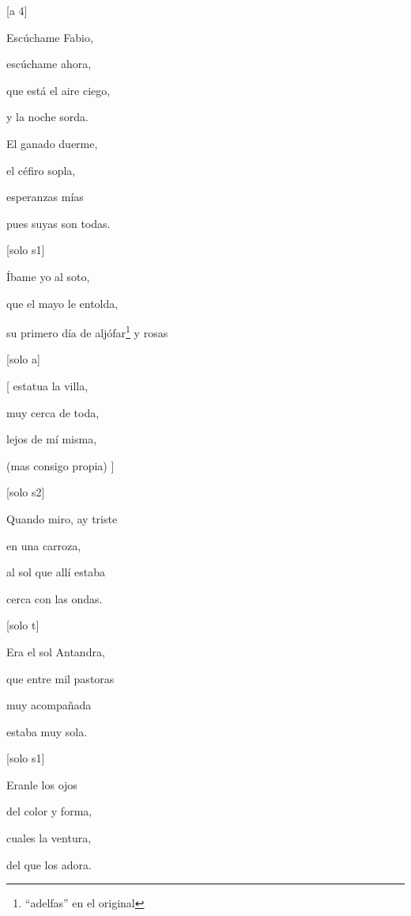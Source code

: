 \documentclass[titlepage,hidelinks]{article}
\begin{document}


\centering
\Large{

{[}a 4{]}

Esc{ú}chame Fabio,

esc{ú}chame ahora,

que está el aire ciego,

y la noche sorda.
\vspace{2\baselineskip}

El ganado duerme,

el céfiro sopla,

esperanzas mías

pues suyas son todas.
\vspace{2\baselineskip}

{[}solo s1{]}

Íbame yo al soto,

que el mayo le entolda,

su primero día de aljófar\footnote{\textsuperscript{}``adelfas'' en el original} y rosas
\vspace{2\baselineskip}

{[}solo a{]}

{[} estatua la villa,

  muy cerca de toda,

  lejos de mí misma,

  (mas consigo propia) {]}
\vspace{2\baselineskip}

{[}solo s2{]}

Quando miro, ay triste

en una carroza,

al sol que allí estaba

cerca con las ondas.
\vspace{2\baselineskip}

{[}solo t{]}

Era el sol Antandra,

que entre mil pastoras

muy acompañada

estaba muy sola.
\vspace{2\baselineskip}

{[}solo s1{]}

Eranle los ojos

del color y forma,

cuales la ventura,

del que los adora.
\vspace{2\baselineskip}

}
\end{document}
